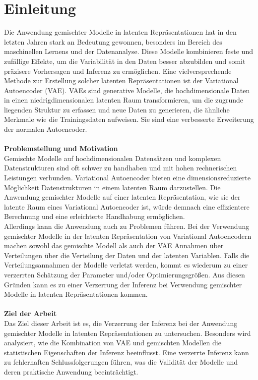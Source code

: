 \documentclass[%
thesis=student,%
coverpage=false,%
titlepage=false,%
headmarks=true, %
german,%
font=libertine, %
math=newpxtx, %
BCOR=5mm,%
coverBCOR=11mm%
]{tumbook}
\theoremstyle{break}
\begin{document}
\chapter{Einleitung}
Die Anwendung gemischter Modelle in latenten Repräsentationen hat in den letzten Jahren stark an Bedeutung gewonnen, besonders im Bereich des maschinellen Lernens und der Datenanalyse. Diese Modelle kombinieren feste und zufällige Effekte, um die Variabilität in den Daten besser abzubilden und somit präzisere Vorhersagen und Inferenz zu ermöglichen. Eine vielversprechende Methode zur Erstellung solcher latenten Repräsentationen ist der Variational Autoencoder (VAE). VAEs sind generative Modelle, die hochdimensionale Daten in einen niedrigdimensionalen latenten Raum transformieren, um die zugrunde liegenden Struktur zu erfassen und neue Daten zu generieren, die ähnliche Merkmale wie die Trainingsdaten aufweisen. Sie sind eine verbesserte Erweiterung der normalen Autoencoder. \\
\\
\textbf{Problemstellung und Motivation}\\
Gemischte Modelle auf hochdimensionalen Datensätzen und komplexen Datenstrukturen sind oft schwer zu handhaben und mit hohen rechnerischen Leistungen verbunden. Variational Autoencoder bieten eine dimensionsreduzierte Möglichkeit Datenstrukturen in einem latenten Raum darzustellen. Die Anwendung gemischter Modelle auf einer latenten Repräsentation, wie sie der latente Raum eines Variational Autoencoder ist, würde demnach eine effizientere Berechnung und eine erleichterte Handhabung ermöglichen.\\
Allerdings kann die Anwendung auch zu Problemen führen. Bei der Verwendung gemischter Modelle in der latenten Repräsentation von Variational Autoencodern machen sowohl das gemischte Modell als auch der VAE Annahmen über Verteilungen über die Verteilung der Daten und der latenten Variablen. Falls die Verteilungsannahmen der Modelle verletzt werden, kommt es wiederum zu einer verzerrten Schätzung der Parameter und/oder Optimierungsgrößen. Aus diesen Gründen kann es zu einer Verzerrung der Inferenz bei Verwendung gemischter Modelle in latenten Repräsentationen kommen.\\
\\
\textbf{Ziel der Arbeit}\\
Das Ziel dieser Arbeit ist es, die Verzerrung der Inferenz bei der Anwendung gemischter Modelle in latenten Repräsentationen zu untersuchen. Besonders wird analysiert, wie die Kombination von VAE und gemischten Modellen die statistischen Eigenschaften der Inferenz beeinflusst. Eine verzerrte Inferenz kann zu fehlerhaften Schlussfolgerungen führen, was die Validität der Modelle und deren praktische Anwendung beeinträchtigt.\\
\end{document}
